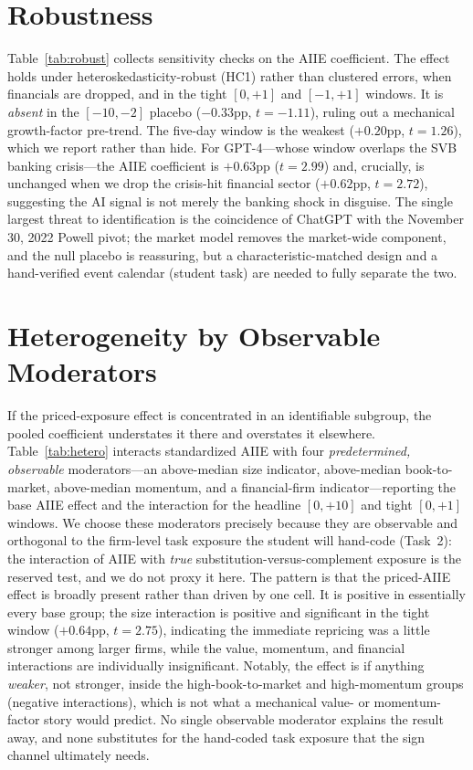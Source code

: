 \documentclass[12pt]{article}
\begin{document}
\section{Robustness}
Table~\ref{tab:robust} collects sensitivity checks on the AIIE coefficient. The effect
holds under heteroskedasticity-robust (HC1) rather than clustered errors, when financials
are dropped, and in the tight $[0,+1]$ and $[-1,+1]$ windows. It is \emph{absent} in the
$[-10,-2]$ placebo ($-0.33$pp, $t=-1.11$), ruling out a mechanical growth-factor pre-trend.
The five-day window is the weakest ($+0.20$pp, $t=1.26$), which we report rather than hide.
For GPT-4---whose window overlaps the SVB banking crisis---the AIIE coefficient is
$+0.63$pp ($t=2.99$) and, crucially, is unchanged when we drop the crisis-hit financial
sector ($+0.62$pp, $t=2.72$), suggesting the AI signal is not merely the banking shock in
disguise. The single largest threat to identification is the coincidence of ChatGPT with
the November 30, 2022 Powell pivot; the market model removes the market-wide component,
and the null placebo is reassuring, but a characteristic-matched design and a
hand-verified event calendar (student task) are needed to fully separate the two.

\section{Heterogeneity by Observable Moderators}\label{sec:het}
If the priced-exposure effect is concentrated in an identifiable subgroup, the pooled coefficient
understates it there and overstates it elsewhere. Table~\ref{tab:hetero} interacts standardized
AIIE with four \emph{predetermined, observable} moderators---an above-median size indicator,
above-median book-to-market, above-median momentum, and a financial-firm indicator---reporting
the base AIIE effect and the interaction for the headline $[0,+10]$ and tight $[0,+1]$ windows.
We choose these moderators precisely because they are observable and orthogonal to the
firm-level task exposure the student will hand-code (Task~2): the interaction of AIIE with
\emph{true} substitution-versus-complement exposure is the reserved test, and we do not proxy it
here. The pattern is that the priced-AIIE effect is broadly present rather than driven by one
cell. It is positive in essentially every base group; the size interaction is positive and
significant in the tight window ($+0.64$pp, $t=2.75$), indicating the immediate repricing was a
little stronger among larger firms, while the value, momentum, and financial interactions are
individually insignificant. Notably, the effect is if anything \emph{weaker}, not stronger,
inside the high-book-to-market and high-momentum groups (negative interactions), which is not
what a mechanical value- or momentum-factor story would predict. No single observable moderator
explains the result away, and none substitutes for the hand-coded task exposure that the sign
channel ultimately needs.
\end{document}
